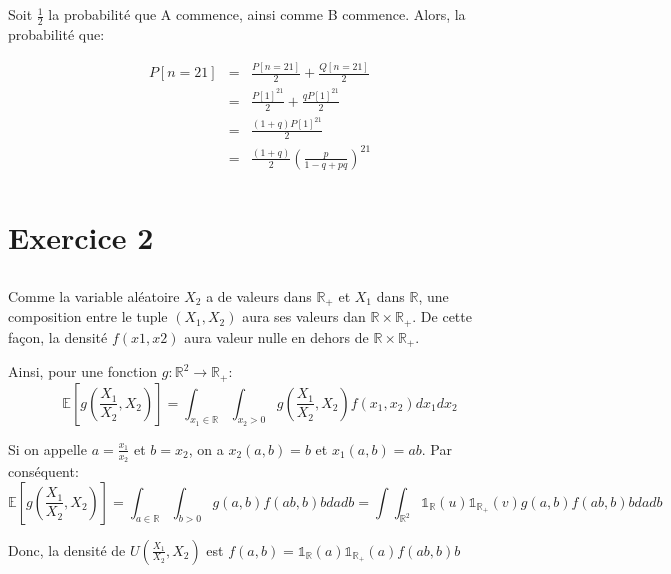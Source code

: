 \documentclass[a4paper]{article}
\begin{document}
\subsection{}
Soit $\frac{1}{2}$ la probabilité que A commence, ainsi comme B commence.
Alors, la probabilité que:

\begin{eqnarray*}
 P[n=21] &=&\frac{P[n=21]}{2}+\frac{Q[n=21]}{2}\\
 &=& \frac{P[1]^{21}}{2}+\frac{qP[1]^{21}}{2}\\
 &=& \frac{(1+q)P[1]^{21}}{2}\\
 &=& \frac{(1+q)}{2}(\frac{p}{1-q+pq})^{21}\\
\end{eqnarray*}



\section{Exercice 2 }
\subsection{}

Comme la variable aléatoire $X_2$ a de valeurs dans $\mathbb{R}_+$ et $X_1$ dans
$\mathbb{R}$, une composition  entre le tuple $(X_1 , X_2)$  aura ses valeurs dan
$\mathbb{R}\times\mathbb{R}_+$. De  cette façon,  la densité $f(x1,  x2)$ aura
valeur nulle en dehors de $\mathbb{R}\times\mathbb{R}_+$.

Ainsi, pour une fonction $g:\mathbb{R}^2 \rightarrow \mathbb{R}_+$:
\begin{equation}
 \mathbb{E}[g(\frac{X_1}{X_2},X_2)]=\int_{x_1 \in \mathbb{R}} \int_{x_2>0}g(\frac{X_1}{X_2},X_2)f(x_1,x_2)dx_1dx_2
\end{equation}

Si   on  appelle   $a=\frac{x_1}{x_2}$  et   $b=x_2$,  on   a   $x_2(a,b)=b$  et
$x_1(a,b)=ab$. Par conséquent:
\begin{equation}
 \mathbb{E}[g(\frac{X_1}{X_2},X_2)]=\int_{a            \in           \mathbb{R}}
 \int_{b>0}g(a,b)f(ab,b)bdadb=\int \int_{\mathbb{R}^2} \mathds{1}_\mathbb{R}(u)\mathds{1}_{\mathbb{R}_+}(v)g(a,b)f(ab,b)bdadb
\end{equation}

Donc, la densité de $U(\frac{X_1}{X_2},X_2)$ est $f(a,b)=\mathds{1}_\mathbb{R}(a)\mathds{1}_{\mathbb{R}_+}(a)f(ab,b)b$

\subsection{}
\end{document}
